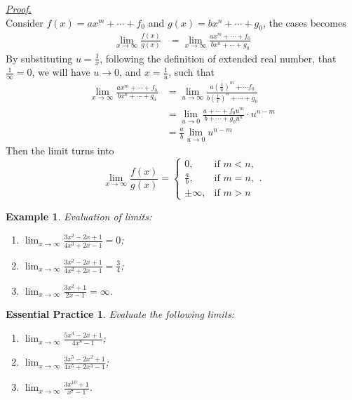 \documentclass[12pt]{article}
\newtheorem*{example}{Example}
\newtheorem{exercise}{Essential Practice}[section]
\renewenvironment{proof}[1][Proof]{\begin{snugshade*} \underline{\textit{{#1}.}}\\}{\hfill \qedsymbol \end{snugshade*}}
\begin{document}
    \begin{proof}
        Consider $f(x)=ax^m+\cdots+f_0$ and $g(x)=bx^n+\cdots+g_0$, the cases becomes \begin{align*}
            \lim_{x\to\infty}\frac{f(x)}{g(x)}&=\lim_{x\to\infty}\frac{ax^m+\cdots+f_0}{bx^n+\cdots+g_0}
        \end{align*}
        By substituting $u=\frac{1}{x}$, following the definition of extended real number, that $\frac{1}{\infty}=0$, we will have $u\to 0$, and $x=\frac{1}{u}$, such that \begin{align*}
            \lim_{x\to\infty}\frac{ax^m+\cdots+f_0}{bx^n+\cdots+g_0}&=\lim_{u\to\infty}\frac{a(\frac{1}{u})^m+\cdots f_0}{b(\frac{1}{x})^n+\cdots+g_0}\\
            &=\lim_{u\to 0}\frac{a+\cdots+f_0 u^m}{b+\cdots+g_0 u^n}\cdot u^{n-m}\\
            &=\frac{a}{b}\lim_{u\to 0}u^{n-m}
        \end{align*}
        Then the limit turns into \[\lim_{x\to\infty}\frac{f(x)}{g(x)}=\begin{cases}
            0,&\textrm{if }m<n,\\
            \frac{a}{b},&\textrm{if }m=n,\\
            \pm\infty,&\textrm{if }m>n
        \end{cases}.\]
    \end{proof}

    \begin{example}
        Evaluation of limits:\begin{enumerate}
            \item $\displaystyle\lim_{x\to\infty}\frac{3x^2-2x+1}{4x^3+2x-1}=0$;
            \item $\displaystyle\lim_{x\to\infty}\frac{3x^2-2x+1}{4x^2+2x-1}=\frac{3}{4}$;
            \item $\displaystyle\lim_{x\to\infty}\frac{3x^2+1}{2x-1}=\infty$.
        \end{enumerate}
    \end{example}

    \begin{exercise}
        Evaluate the following limits:\begin{enumerate}
            \item $\displaystyle\lim_{x\to\infty}\frac{5x^4-2x+1}{4x^8-1}$;
            \item $\displaystyle\lim_{x\to\infty}\frac{3x^5-2x^2+1}{4x^5+2x^3-1}$;
            \item $\displaystyle\lim_{x\to\infty}\frac{3x^{10}+1}{x^7-1}$.
        \end{enumerate}
    \end{exercise}
\end{document}
